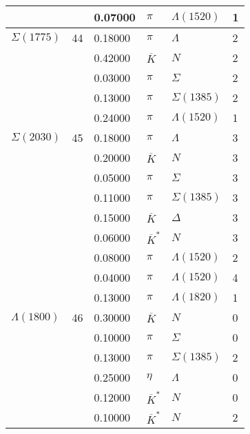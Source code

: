 \documentclass[a4paper,10pt]{article}
\begin{document}
\begin{tabular}[t]{|lr|l|ll|l|}
$                    $&   & 0.07000&$ \pi                 $ &$ \Lambda(1520)       $& 1\\
\hline
$      \Sigma(1775)  $& 44& 0.18000&$ \pi                 $ &$ \Lambda             $& 2\\
$                    $&   & 0.42000&$ \overline{K}        $ &$ N                   $& 2\\
$                    $&   & 0.03000&$ \pi                 $ &$ \Sigma              $& 2\\
$                    $&   & 0.13000&$ \pi                 $ &$ \Sigma(1385)        $& 2\\
$                    $&   & 0.24000&$ \pi                 $ &$ \Lambda(1520)       $& 1\\
\hline
$      \Sigma(2030)  $& 45& 0.18000&$ \pi                 $ &$ \Lambda             $& 3\\
$                    $&   & 0.20000&$ \overline{K}        $ &$ N                   $& 3\\
$                    $&   & 0.05000&$ \pi                 $ &$ \Sigma              $& 3\\
$                    $&   & 0.11000&$ \pi                 $ &$ \Sigma(1385)        $& 3\\
$                    $&   & 0.15000&$ \overline{K}        $ &$ \Delta              $& 3\\
$                    $&   & 0.06000&$ \overline{K}^*      $ &$ N                   $& 3\\
$                    $&   & 0.08000&$ \pi                 $ &$ \Lambda(1520)       $& 2\\
$                    $&   & 0.04000&$ \pi                 $ &$ \Lambda(1520)       $& 4\\
$                    $&   & 0.13000&$ \pi                 $ &$ \Lambda(1820)       $& 1\\
\hline
$      \Lambda(1800) $& 46& 0.30000&$ \overline{K}        $ &$ N                   $& 0\\
$                    $&   & 0.10000&$ \pi                 $ &$ \Sigma              $& 0\\
$                    $&   & 0.13000&$ \pi                 $ &$ \Sigma(1385)        $& 2\\
$                    $&   & 0.25000&$ \eta                $ &$ \Lambda             $& 0\\
$                    $&   & 0.12000&$ \overline{K}^*      $ &$ N                   $& 0\\
$                    $&   & 0.10000&$ \overline{K}^*      $ &$ N                   $& 2\\
\hline
\end{tabular}
\end{document}
